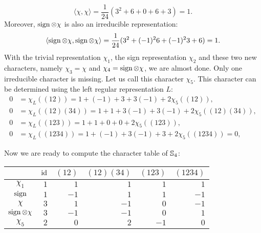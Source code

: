 \begin{example}
      \[
	 	\langle \chi,\chi\rangle=\frac{1}{24}(3^2+6+0+6+3)=1.
	 \]
     Moreover, $\operatorname{sign}\otimes\chi$ is also an irreducible representation:
     	\[
		\langle \operatorname{sign}\otimes\chi,\operatorname{sign}\otimes\chi\rangle=\frac{1}{24}(3^2+(-1)^26+(-1)^23+6)=1.
	\]
     With the trivial representation $\chi_1$, the sign representation $\chi_2$ and these two new characters, namely $\chi_3=\chi$ and $\chi_4=\operatorname{sign}\otimes\chi$, we are almost done. Only one irreducible character is missing. Let us call this
     character $\chi_5$. This character can be determined  
     using the left regular representation $L$: 
     \begin{align*}
		0 &= \chi_L\left( (12) \right)=1+(-1)+3+3(-1)+2\chi_5\left( (12) \right),\\
		0 &= \chi_L\left( (12)(34) \right)=1+1+3(-1)+3(-1)+2\chi_5\left( (12)(34) \right),\\
		0 &= \chi_L\left( (123) \right)=1+1+0+0+2\chi_5\left( (123) \right),\\
		0 &= \chi_L\left( (1234) \right)=1+(-1)+3(-1)+3+2\chi_5\left( (1234) \right)=0,
	\end{align*}
	
    Now we are ready to compute the character table of $\mathbb{S}_4$: 
	\begin{center}
		\begin{tabular}{|c|rrrrr|}
			\hline
			& $\operatorname{id}$ & $(12)$ & $(12)(34)$ & $(123)$ & $(1234)$\tabularnewline
			\hline
			$\chi_1$ & $1$ & $1$ & $1$ & $1$ & $1$\tabularnewline
			$\operatorname{sign}$ & $1$ & $-1$ & $1$ & $1$ & $-1$\tabularnewline
			$\chi$ & $3$ & $1$ & $-1$ & $0$ & $-1$\tabularnewline
			$\operatorname{sign}\otimes\chi$ & $3$ & $-1$ & $-1$ & $0$ & $1$\tabularnewline
			$\chi_5$ & $2$ & $0$ & $2$ & $-1$ & $0$\tabularnewline
			\hline
		\end{tabular}
	\end{center}
\end{example}


